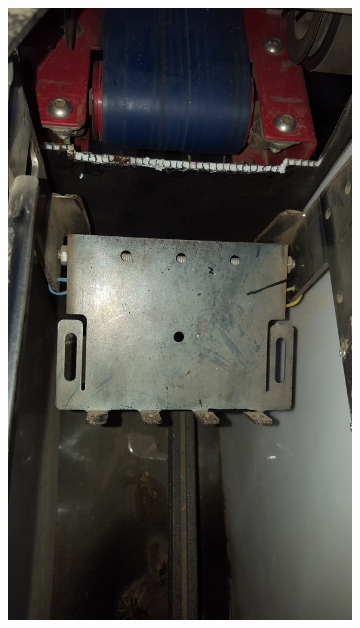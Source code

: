 \documentclass[fleqn,twoside,12pt]{report}
\begin{document}
\begin{figure}[ht]
	\centering
	\begin{subfigure}{.5\textwidth}
		\centering
		\includegraphics[width=\linewidth, angle=270]{inside_enclosure_1.jpg}
		\caption{}
		\label{fig:inside_enclosure_1}
	\end{subfigure}%
	\begin{subfigure}{.5\textwidth}
		\centering

\end{subfigure}
\end{figure}
\end{document}
